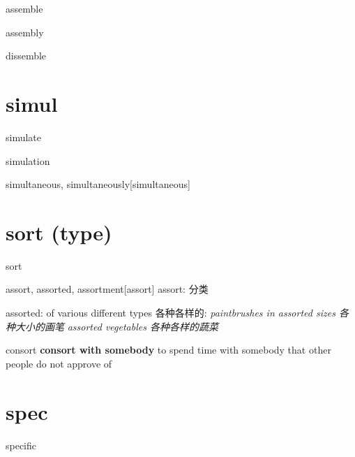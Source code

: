 \begin{RefWord}{assemble}
\end{RefWord}

\begin{RefWord}{assembly}
\end{RefWord}

\begin{RefWord}{dissemble}
\end{RefWord}

\section{simul}

\begin{RefWord}{simulate}
\end{RefWord}

\begin{RefWord}{simulation}
\end{RefWord}

\begin{RefWord}{simultaneous, simultaneously}[simultaneous]
\end{RefWord}

\section{sort (type)}

\begin{RefWord}{sort}
\end{RefWord}

\begin{RefWord}{assort, assorted, assortment}[assort]
    assort: 分类


    assorted: of various different types 各种各样的:
    \textit{paintbrushes in assorted sizes 各种大小的画笔}
    \textit{assorted vegetables 各种各样的蔬菜}
\end{RefWord}

\begin{RefWord}{consort}
    \textbf{consort with somebody} to spend time with somebody that other people do not approve of

\end{RefWord}

\section{spec}

\begin{RefWord}{specific}
\end{RefWord}

